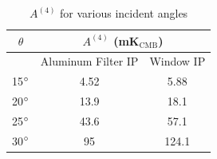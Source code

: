 \documentclass{article}
\theoremstyle{remark}
\newcommand{\A}[1]{A^{(#1)}}
\begin{document}
\begin{table}[h]
\centering

\begin{tabular}{|c|c|c|}
\hline
$\theta$ & \multicolumn{2}{|c|}{$\A4 $ (mK$_\text{CMB}$)} \\
\hline
      & Aluminum Filter IP   & Window IP            \\
\hline
15$\degree$  & 4.52  & 5.88 \\
20$\degree$  & 13.9 & 18.1  \\
25$\degree$  & 43.6 & 57.1   \\
30$\degree$  & 95 & 124.1 \\\hline
\end{tabular}
\caption{ $\A4$ for various incident angles
}
\label{table:HWPSS}
\end{table}
\end{document}

